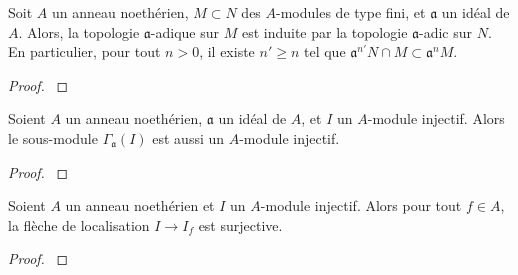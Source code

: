 \begin{thm}[de Krull]
Soit $A$ un anneau noethérien, $M\subset N$ des $A$-modules de type fini, et $\mathfrak{a}$ un idéal de $A$. Alors, la topologie $\mathfrak{a}$-adique sur $M$ est induite par la topologie $\mathfrak{a}$-adic sur $N$. En particulier, pour tout $n>0$, il existe $n'\geq n$ tel que $\mathfrak{a}^{n'}N\cap M\subset\mathfrak{a}^nM$.
\end{thm}
\begin{proof}
\cite[10.11]{atiyahmacdo}
\end{proof}

\begin{cor}\label{cohomAffLemme1}
Soient $A$ un anneau noethérien, $\mathfrak{a}$ un idéal de $A$, et $I$ un $A$-module injectif. Alors le sous-module $\Gamma_\mathfrak{a}(I)$ est aussi un $A$-module injectif.
\end{cor}
\begin{proof}
\cite[III.3.2]{Hartshorne} 
\end{proof}

\begin{lem}
Soient $A$ un anneau noethérien et $I$ un $A$-module injectif. Alors pour tout $f\in A$, la flèche de localisation $I\rightarrow I_f$ est surjective.
\end{lem}
\begin{proof}
\cite[III.3.3]{Hartshorne} 
\end{proof}

